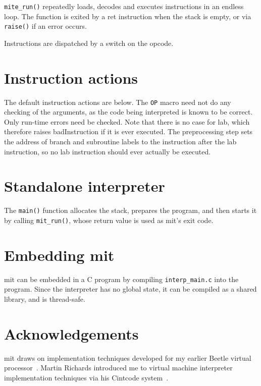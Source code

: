 \documentclass[english]{scrartcl}
\newcommand{\absfont}{\sffamily}
\newcommand{\abs}[1]{{\absfont #1}}
\begin{document}
\verb|mite_run()| repeatedly loads, decodes and executes instructions
in an endless loop. The function is exited by a \abs{ret} instruction
when the stack is empty, or via \verb|raise()| if an error occurs.

Instructions are dispatched by a switch on the opcode.


\section{Instruction actions} \label{actions}

The default instruction actions are below. The \verb|OP| macro need
not do any checking of the arguments, as the code being interpreted is
known to be correct. Only run-time errors need be checked. Note that
there is no case for \abs{lab}, which therefore raises
\abs{badInstruction} if it is ever executed. The preprocessing step
sets the address of branch and subroutine labels to the instruction
after the \abs{lab} instruction, so no \abs{lab} instruction should
ever actually be executed.



\section{Standalone interpreter}

The \verb|main()| function allocates the stack, prepares the program,
and then starts it by calling \verb|mit_run()|, whose return value is
used as mit's exit code.



\section{Embedding mit}

mit can be embedded in a C program by compiling \verb|interp_main.c|
into the program. Since the interpreter has no global state, it can be
compiled as a shared library, and is thread-safe.



\section{Acknowledgements}

mit draws on implementation techniques developed for my earlier Beetle
virtual processor~\cite{beetledis}. Martin Richards introduced me to
virtual machine interpreter implementation techniques via his Cintcode
system~\cite{cintweb}.





\end{document}
